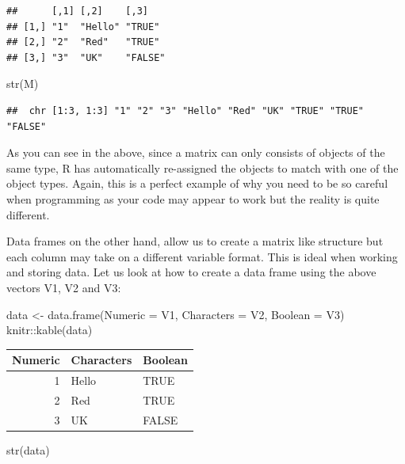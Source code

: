 \documentclass[
]{book}
\newenvironment{Shaded}{\begin{snugshade}}{\end{snugshade}}
\newcommand{\AttributeTok}[1]{\textcolor[rgb]{0.77,0.63,0.00}{#1}}
\newcommand{\FunctionTok}[1]{\textcolor[rgb]{0.00,0.00,0.00}{#1}}
\newcommand{\NormalTok}[1]{#1}
\newcommand{\OtherTok}[1]{\textcolor[rgb]{0.56,0.35,0.01}{#1}}
\newcommand{\SpecialCharTok}[1]{\textcolor[rgb]{0.00,0.00,0.00}{#1}}
\theoremstyle{definition}
\theoremstyle{definition}
\theoremstyle{definition}
\theoremstyle{definition}
\theoremstyle{remark}
\begin{document}
\begin{verbatim}
##      [,1] [,2]    [,3]   
## [1,] "1"  "Hello" "TRUE" 
## [2,] "2"  "Red"   "TRUE" 
## [3,] "3"  "UK"    "FALSE"
\end{verbatim}

\begin{Shaded}
\begin{Highlighting}[]
\FunctionTok{str}\NormalTok{(M)}
\end{Highlighting}
\end{Shaded}

\begin{verbatim}
##  chr [1:3, 1:3] "1" "2" "3" "Hello" "Red" "UK" "TRUE" "TRUE" "FALSE"
\end{verbatim}

As you can see in the above, since a matrix can only consists of objects of the same type, R has automatically re-assigned the objects to match with one of the object types. Again, this is a perfect example of why you need to be so careful when programming as your code may appear to work but the reality is quite different.

Data frames on the other hand, allow us to create a matrix like structure but each column may take on a different variable format. This is ideal when working and storing data. Let us look at how to create a data frame using the above vectors V1, V2 and V3:

\begin{Shaded}
\begin{Highlighting}[]
\NormalTok{data }\OtherTok{\textless{}{-}} \FunctionTok{data.frame}\NormalTok{(}\AttributeTok{Numeric =}\NormalTok{ V1, }\AttributeTok{Characters =}\NormalTok{ V2, }\AttributeTok{Boolean =}\NormalTok{ V3)}
\NormalTok{knitr}\SpecialCharTok{::}\FunctionTok{kable}\NormalTok{(data)}
\end{Highlighting}
\end{Shaded}

\begin{tabular}{r|l|l}
\hline
Numeric & Characters & Boolean\\
\hline
1 & Hello & TRUE\\
\hline
2 & Red & TRUE\\
\hline
3 & UK & FALSE\\
\hline
\end{tabular}

\begin{Shaded}
\begin{Highlighting}[]
\FunctionTok{str}\NormalTok{(data) }
\end{Highlighting}
\end{Shaded}
\end{document}
